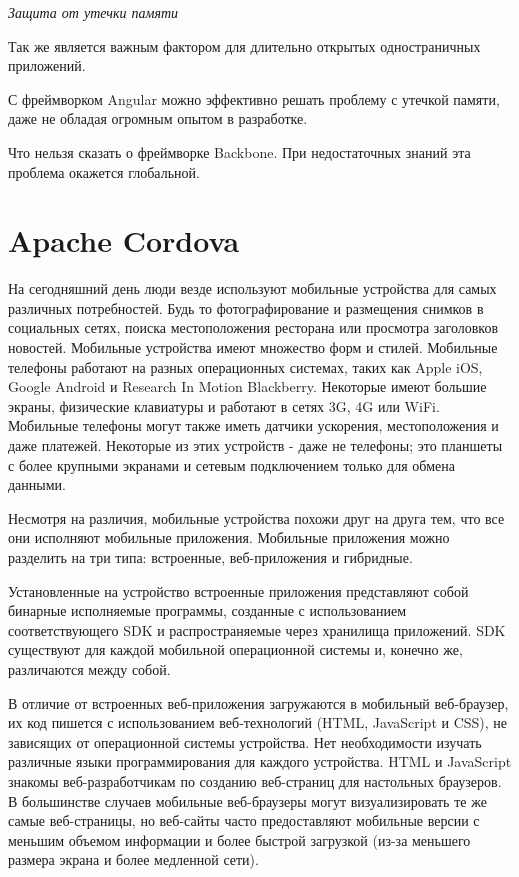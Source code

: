 {\itshape Защита от утечки памяти} 

Так же является важным фактором для длительно открытых одностраничных приложений.

С фреймворком Angular можно эффективно решать проблему с утечкой памяти, даже не обладая огромным опытом в разработке.

Что нельзя сказать о фреймворке Backbone. При недостаточных знаний эта проблема окажется глобальной.

\section{Apache Cordova}
На сегодняшний день люди везде используют мобильные устройства для самых различных потребностей. Будь то фотографирование и размещения снимков в социальных сетях, поиска местоположения ресторана или просмотра заголовков новостей. Мобильные устройства имеют множество форм и стилей. Мобильные телефоны работают на разных операционных системах, таких как Apple iOS, Google Android и Research In Motion Blackberry. Некоторые имеют большие экраны, физические клавиатуры и работают в сетях 3G, 4G или WiFi. Мобильные телефоны могут также иметь датчики ускорения, местоположения и даже платежей. Некоторые из этих устройств - даже не телефоны; это планшеты с более крупными экранами и сетевым подключением только для обмена данными.

Несмотря на различия, мобильные устройства похожи друг на друга тем, что все они исполняют мобильные приложения. Мобильные приложения можно разделить на три типа: встроенные, веб-приложения и гибридные.

Установленные на устройство встроенные приложения представляют собой бинарные исполняемые программы, созданные с использованием соответствующего  SDK  и  распространяемые  через  хранилища приложений. SDK существуют для каждой мобильной операционной системы и, конечно же, различаются между собой.

В отличие от встроенных веб-приложения загружаются в мобильный веб-браузер, их код пишется с использованием веб-технологий (HTML, JavaScript и CSS), не зависящих от операционной системы устройства. Нет необходимости изучать различные языки программирования для каждого устройства. HTML и JavaScript знакомы веб-разработчикам по созданию веб-страниц для настольных браузеров. В большинстве случаев мобильные веб-браузеры могут визуализировать те же самые веб-страницы, но веб-сайты часто предоставляют мобильные версии с меньшим объемом информации и более быстрой загрузкой (из-за меньшего размера экрана и более медленной сети).

